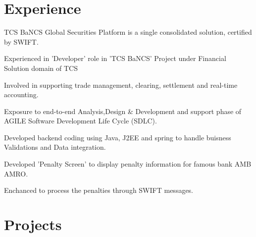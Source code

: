 \documentclass[]{deedy-resume-openfont}
\begin{document}
\hfill
\begin{minipage}[t]{0.66\textwidth} 
\section{Experience}
\vspace{\topsep}
\vspace{\topsep}
\begin{tightemize}
\item TCS BaNCS Global Securities Platform is a single consolidated solution, certified by SWIFT.
\item Experienced in 'Developer' role in 'TCS BaNCS' Project under Financial Solution domain of TCS
\item Involved in supporting trade management, clearing, settlement and real-time accounting.
\item Exposure to end-to-end Analysis,Design \& Development and support phase of AGILE Software Development Life Cycle (SDLC).
\item Developed backend coding using Java, J2EE and spring to handle buisness Validations and Data integration.\\
\vspace{\topsep}
\item Developed 'Penalty Screen' to display penalty information for famous bank AMB AMRO.
\item Enchanced to process the penalties through SWIFT messages.
\end{tightemize} 

\sectionsep

\section{Projects}


\end{minipage}
\end{document}
